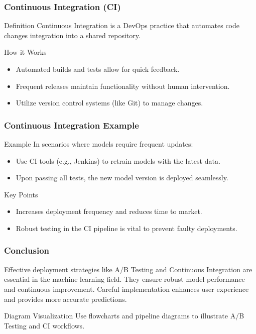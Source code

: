 \documentclass[aspectratio=169]{beamer}
\begin{document}
\begin{frame}[fragile]
    \frametitle{Continuous Integration (CI)}
    \begin{block}{Definition}
        Continuous Integration is a DevOps practice that automates code changes integration into a shared repository.
    \end{block}

    \begin{block}{How it Works}
        \begin{itemize}
            \item Automated builds and tests allow for quick feedback.
            \item Frequent releases maintain functionality without human intervention.
            \item Utilize version control systems (like Git) to manage changes.
        \end{itemize}
    \end{block}
\end{frame}

\begin{frame}[fragile]
    \frametitle{Continuous Integration Example}
    \begin{block}{Example}
        In scenarios where models require frequent updates:
        \begin{itemize}
            \item Use CI tools (e.g., Jenkins) to retrain models with the latest data.
            \item Upon passing all tests, the new model version is deployed seamlessly.
        \end{itemize}
    \end{block}

    \begin{block}{Key Points}
        \begin{itemize}
            \item Increases deployment frequency and reduces time to market.
            \item Robust testing in the CI pipeline is vital to prevent faulty deployments.
        \end{itemize}
    \end{block}
\end{frame}

\begin{frame}[fragile]
    \frametitle{Conclusion}
    Effective deployment strategies like A/B Testing and Continuous Integration are essential in the machine learning field. They ensure robust model performance and continuous improvement. Careful implementation enhances user experience and provides more accurate predictions.
    
    \begin{block}{Diagram Visualization}
        Use flowcharts and pipeline diagrams to illustrate A/B Testing and CI workflows.
    \end{block}
\end{frame}
\end{document}
